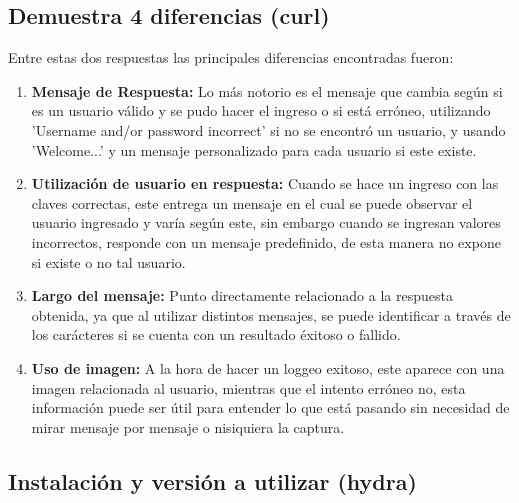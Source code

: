 \documentclass[letter,12pt]{article}
\begin{document}
\subsection{Demuestra 4 diferencias (curl)}

Entre estas dos respuestas las principales diferencias encontradas fueron:
\begin{enumerate}
    \item \textbf{Mensaje de Respuesta:} Lo más notorio es el mensaje que cambia según si es un usuario válido y se pudo hacer el ingreso o si está erróneo, utilizando 'Username and/or password incorrect' si no se encontró un usuario, y usando 'Welcome...' y un mensaje personalizado para cada usuario si este existe.
    \item \textbf{Utilización de usuario en respuesta:} Cuando se hace un ingreso con las claves correctas, este entrega un mensaje en el cual se puede observar el usuario ingresado y varía según este, sin embargo cuando se ingresan valores incorrectos, responde con un mensaje predefinido, de esta manera no expone si existe o no tal usuario.
    \item \textbf{Largo del mensaje:} Punto directamente relacionado a la respuesta obtenida, ya que al utilizar distintos mensajes, se puede identificar a través de los carácteres si se cuenta con un resultado éxitoso o fallido.
    \item \textbf{Uso de imagen:} A la hora de hacer un loggeo exitoso, este aparece con una imagen relacionada al usuario, mientras que el intento erróneo no, esta información puede ser útil para entender lo que está pasando sin necesidad de mirar mensaje por mensaje o nisiquiera la captura.
\end{enumerate}

\subsection{Instalación y versión a utilizar (hydra)}
\end{document}
